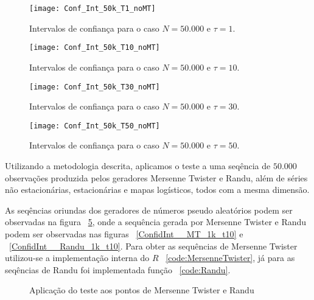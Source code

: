 \begin{figure}
	\centering
	\texttt{[image: Conf\_Int\_50k\_T1\_noMT]}
	\caption{Intervalos de confiança para o caso $N=50.000$ e $\tau=1$.}\label{Fig:Conf_Int_50k_T1}
\end{figure}

\begin{figure}
	\centering
	\texttt{[image: Conf\_Int\_50k\_T10\_noMT]}
	\caption{Intervalos de confiança para o caso $N=50.000$ e $\tau=10$.}\label{Fig:Conf_Int_50k_T10}
\end{figure}

\begin{figure}
	\centering
	\texttt{[image: Conf\_Int\_50k\_T30\_noMT]}
	\caption{Intervalos de confiança para o caso $N=50.000$ e $\tau=30$.}\label{Fig:Conf_Int_50k_30}
\end{figure}

\begin{figure}
	\centering
	\texttt{[image: Conf\_Int\_50k\_T50\_noMT]}
	\caption{Intervalos de confiança para o caso $N=50.000$ e $\tau=50$.}\label{Fig:Conf_Int_50k_T50}
\end{figure}


Utilizando a metodologia descrita, aplicamos o teste a uma seqência de $50.000$ observações produzida pelos geradores Mersenne Twister e Randu, além de séries não estacionárias, estacionárias e mapas logísticos, todos com a mesma dimensão.

As seqências oriundas dos geradores de números pseudo aleatórios podem ser observadas na figura ~\ref{fig:ConfInt_PRNGs}, onde a sequência gerada por Mersenne Twister e Randu podem ser observadas nas figuras ~\ref{ConfidInt__MT_1k_t10} e ~\ref{ConfidInt__Randu_1k_t10}. 
Para obter as sequências de Mersenne Twister utilizou-se a implementação interna do $R$ ~\ref{code:MersenneTwister},
já para as seqências de Randu foi implementada  função ~\ref{code:Randu}.

\begin{figure}
	\centering
	\caption{Aplicação do teste aos pontos de Mersenne Twister e Randu}\label{fig:ConfInt_PRNGs}
\end{figure}

